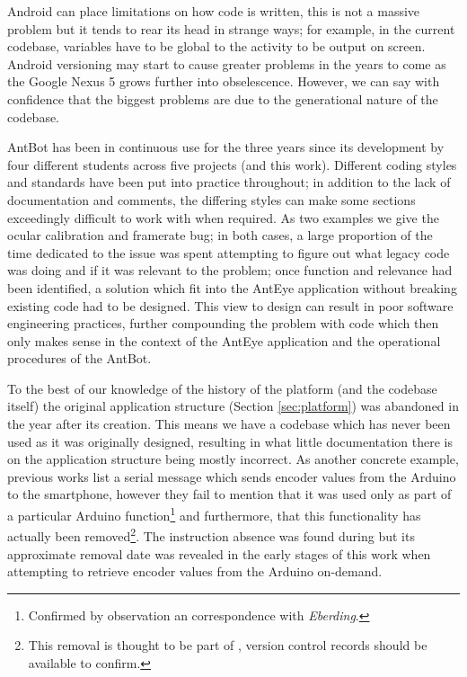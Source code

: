 \documentclass[a4paper,11pt,twoside,openright]{article}
\begin{document}
Android can place limitations on how code is written, this is not a
massive problem but it tends to rear its head in strange ways; for
example, in the current codebase, variables have to be global to the
activity to be output on screen. Android versioning may start to cause
greater problems in the years to come as the Google Nexus 5 grows
further into obselescence. However, we can say with confidence that the
biggest problems are due to the generational nature of the codebase.
\newline\par

AntBot has been in continuous use for the three years since its
development by four different students across five projects
\cite{Eberding2016,Scimeca2017,Zhang2017,Mitchell2018} (and this
work). Different coding styles and standards have been put into
practice throughout; in addition to the lack of documentation and
comments, the differing styles can make some sections exceedingly
difficult to work with when required. As two examples we give the
ocular calibration and framerate bug; in both cases, a large
proportion of the time dedicated to the issue was spent attempting to
figure out what legacy code was doing and if it was relevant to the
problem; once function and relevance had been identified, a solution
which fit into the AntEye application without breaking existing code
had to be designed. This view to design can result in poor software
engineering practices, further compounding the problem with code which
then only makes sense in the context of the AntEye application and the
operational procedures of the AntBot.
\newline\par

To the best of our knowledge of the history of the platform (and the
codebase itself) the original application structure (Section
\ref{sec:platform}) was abandoned in the year after its creation.
This means we have a codebase which has never been used as it was
originally designed, resulting in what little documentation there is
on the application structure being mostly incorrect. As another
concrete example, previous works \cite{Eberding2016, Scimeca2017,
  Zhang2017} list a serial message which sends encoder values from the
Arduino to the smartphone, however they fail to mention that it was
used only as part of a particular Arduino function\footnote{Confirmed
  by observation an correspondence with \textit{Eberding}.} and furthermore,
that this functionality has actually been removed\footnote{This removal is
thought to be part of \cite{Scimeca2017}, version control records
should be available to confirm.}. The instruction absence was found
during \cite{Mitchell2018} but its approximate removal date was
revealed in the early stages of this work when attempting to retrieve
encoder values from the Arduino on-demand.
\newline\par
\end{document}
